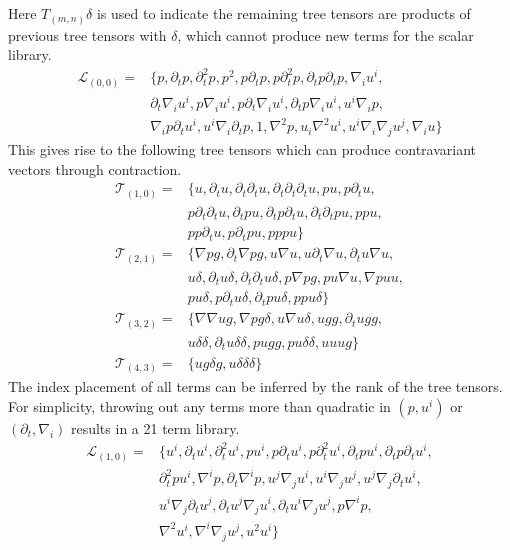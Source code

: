 \documentclass[
 reprint,
 amsmath,amssymb,
 aps,
]{revtex4-2}
\begin{document}
Here $T_{(m,n)}\delta$ is used to indicate the remaining tree tensors are products of previous tree tensors with $\delta$, which cannot produce new terms for the scalar library.
\begin{align}
    \mathcal{L}_{(0,0)} = & \{ p, \partial_t p, \partial_t^2 p, p^2, p\partial_tp, p\partial_t^2 p, \partial_t p \partial_t p, %
    \nabla_i u^i, \nonumber \\
    &\partial_t \nabla_i u^i, p \nabla_i u^i, p \partial_t \nabla_i u^i, \partial_tp \nabla_i u^i, u^i \nabla_i p, \nonumber \\
    &\nabla_i p \partial_t u^i, u^i \nabla_i \partial_t p, 1,  %
    \nabla^2 p, u_i \nabla^2 u^i, u^i \nabla_i \nabla_j u^j, \nabla_i u
    \} 
\end{align}
This gives rise to the following tree tensors which can produce contravariant vectors through contraction.
\begin{align}
    \mathcal{T}_{(1,0)} = &\{ u , \partial_t u , \partial_t \partial_t u , \partial_t \partial_t \partial_t u , p u , p \partial_t u , \nonumber \\ 
    & p \partial_t \partial_t u , \partial_t p u , \partial_t p \partial_t u , \partial_t \partial_t p u , p p u , \nonumber \\
    & p p \partial_t u , p \partial_t p u , p p p u \}\\
    \mathcal{T}_{(2,1)} = &\{ \nabla p g , \partial_t \nabla p g , u \nabla u , u \partial_t \nabla u , \partial_t u \nabla u , \nonumber \\
    &  u \delta , \partial_t u \delta , \partial_t \partial_t u \delta , p \nabla p g, p u \nabla u, \nabla p u u , \nonumber \\
    & p u \delta , p \partial_t u \delta , \partial_t p u \delta , p p u \delta \}\\
    \mathcal{T}_{(3,2)} = &\{    \nabla \nabla u g , \nabla p g \delta , u \nabla u \delta , u g g , \partial_t u g g ,\nonumber\\ 
    &u \delta \delta, \partial_t u \delta \delta , p u g g , p u \delta \delta , u u u g \}\\
    \mathcal{T}_{(4,3)} = &\{ u g \delta g , u \delta \delta \delta\}
\end{align}
The index placement of all terms can be inferred by the rank of the tree tensors. For simplicity, throwing out any terms more than quadratic in $(p,u^i)$ or $(\partial_t, \nabla_i)$ results in a 21 term library.
\begin{align}
\mathcal{L}_{(1,0)} = & \{ u^i, \partial_t u^i, \partial_t^2 u^i, p u^i, p \partial_t u^i, p \partial_t^2 u^i, \partial_t p u^i, \partial_t p \partial_t u^i, \nonumber\\
&\partial_t^2 p u^i, %
\nabla^i p, \partial_t \nabla^i p, u^j \nabla_j u^i, u^i \nabla_j u^j, u^j \nabla_j \partial_t u^i, \nonumber \\
&u^i \nabla_j \partial_t u^j, \partial_t u^j \nabla_j u^i, \partial_t u^i \nabla_j u^j, p \nabla^i p, %
\nonumber\\
&\nabla^2 u^i, \nabla^i \nabla_j u^j, u^2 u^i %
\}
\end{align}
\end{document}
